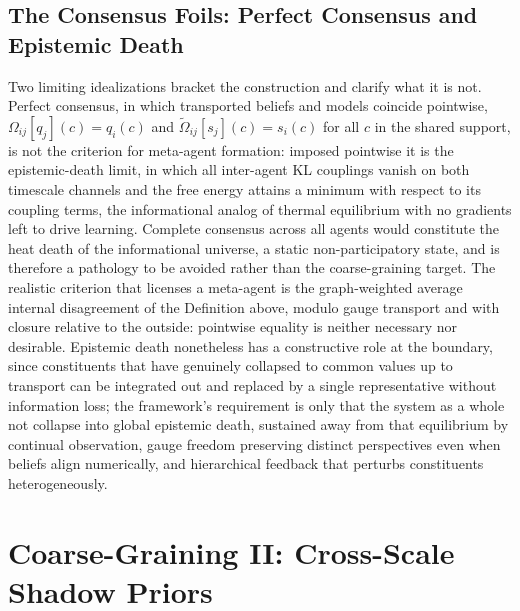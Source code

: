 \documentclass[11pt]{article}
\begin{document}
\subsection{The Consensus Foils: Perfect Consensus and Epistemic Death}
\label{sec:epistemic_collapse}

Two limiting idealizations bracket the construction and clarify what it is not. Perfect consensus, in which transported beliefs and models coincide pointwise, $\Omega_{ij}[q_j](c) = q_i(c)$ and $\tilde{\Omega}_{ij}[s_j](c) = s_i(c)$ for all $c$ in the shared support, is not the criterion for meta-agent formation: imposed pointwise it is the epistemic-death limit, in which all inter-agent KL couplings vanish on both timescale channels and the free energy attains a minimum with respect to its coupling terms, the informational analog of thermal equilibrium with no gradients left to drive learning. Complete consensus across all agents would constitute the heat death of the informational universe, a static non-participatory state, and is therefore a pathology to be avoided rather than the coarse-graining target. The realistic criterion that licenses a meta-agent is the graph-weighted average internal disagreement of the Definition above, modulo gauge transport and with closure relative to the outside: pointwise equality is neither necessary nor desirable. Epistemic death nonetheless has a constructive role at the boundary, since constituents that have genuinely collapsed to common values up to transport can be integrated out and replaced by a single representative without information loss; the framework's requirement is only that the system as a whole not collapse into global epistemic death, sustained away from that equilibrium by continual observation, gauge freedom preserving distinct perspectives even when beliefs align numerically, and hierarchical feedback that perturbs constituents heterogeneously.

\section{Coarse-Graining II: Cross-Scale Shadow Priors}\label{sec:cross_scale_shadows}
\end{document}
